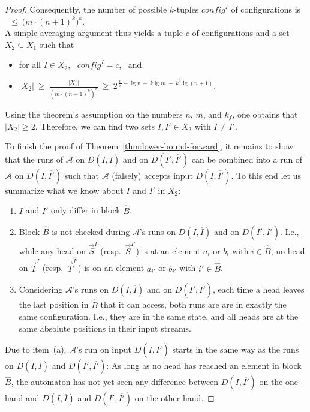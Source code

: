 \documentclass[proceedings]{stacs}
\theoremstyle{plain}\newtheorem{satz}[thm]{Satz}
\theoremstyle{definition}\newtheorem{crucial}[thm]{Crucial Definition}
\newcommand{\ov}[1]{\overline{#1}}
\newcommand{\vek}[1]{\vec{#1}}
\renewcommand*{\geq}{\ensuremath{\geqslant}}
\renewcommand*{\leq}{\ensuremath{\leqslant}}
\newcommand*{\A}{\ensuremath{\mathcal{A}}}
\newenvironment{mi}{\begin{itemize}}{\end{itemize}}
\newenvironment{mea}{\begin{enumerate}[\mbox{\quad }(a)]}{\end{enumerate}}
\newcommand{\kf}{\ensuremath{k_{\scriptscriptstyle f}}}
\newcommand{\vv}{\ensuremath{v}}
\newcommand{\config}{\ensuremath{\textit{config}}}
\begin{document}
\begin{proof}
Consequently, the number of possible $k$-tuples $\config^I$ of configurations is 
\ $\leq \ \big( m\cdot (n{+}1)^{k} \big)^{k}$.
\\
A simple averaging argument thus yields a tuple $c$ of configurations and
a set $X_2\subseteq X_1$ such that \vspace{1ex}
\begin{mi}
 \item 
   for all $I\in X_2$, \ $\config^I = c$, \ and \vspace{1ex}
 \item
   $|X_2| \ \geq \ \frac{|X_1|}{( m\cdot (n{+}1)^{k})^{k}} \ \geq \  
    2^{\, \frac{n}{\vv} - \lg \vv \ - \ k \lg m \ - \ k^2 \lg(n+1)}.
   $ \vspace{1ex}
\end{mi}
Using the theorem's assumption on the 
numbers $n$, $m$, and $\kf$, one obtains that $|X_2|\geq 2$.
Therefore, we can find two sets $I,I'\in X_2$ with $I\neq I'$.

To finish the proof of Theorem~\ref{thm:lower-bound-forward}, it remains to show that
the runs of $\A$ on $D(I,\ov{I})$ and on $D(I',\ov{I'})$ 
can be combined into a run of $\A$ on $D(I,\ov{I'})$ such that $\A$ (falsely) accepts
input $D(I,\ov{I'})$. To this end let us summarize what we know about $I$ and $I'$ in 
$X_2$: \vspace{1ex}

\begin{mea}
 \item $I$ and $I'$ only differ in block $\hat{B}$.
  \vspace{1ex}
 \item Block $\hat{B}$ is not checked during $\A$'s runs on $D(I,\ov{I})$ and 
   on $D(I',\ov{I'})$. I.e., while any head on $\vek{S}^I$ (resp.\ $\vek{S}^{I'}$) is
   at an element $a_i$ or $b_i$ with $i\in \hat{B}$, no head on $\vek{T}^{\ov{I}}$
   (resp.\ $\vek{T}^{\ov{I'}}$) is on an element $a_{i'}$ or $b_{i'}$ with $i'\in \hat{B}$.
  \vspace{1ex}
 \item Considering $\A$'s runs on $D(I,\ov{I})$ and on $D(I',\ov{I'})$, each
  time a head leaves the last position in $\hat{B}$ that it can access, both runs are 
  are in exactly the same configuration. I.e., they are in the same state, and all
  heads are at the same absolute positions in their input streams.
  \vspace{1ex}
\end{mea}

\noindent
Due to item~(a),
$\A$'s run on input $D(I,\ov{I'})$ starts in the same way as the runs on
$D(I,\ov{I})$ and $D(I',\ov{I'})$: As long as no head has reached an element in
block $\hat{B}$, the automaton has not yet seen any difference between $D(I,\ov{I'})$ on
the one hand and $D(I,\ov{I})$ and $D(I',\ov{I'})$ on the other hand.


\end{proof}
\end{document}
